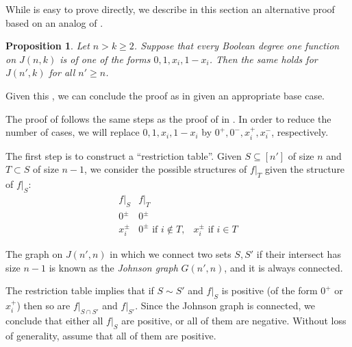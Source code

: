 \documentclass{article}
\newtheorem{proposition}[theorem]{Proposition}
\theoremstyle{definition}
\begin{document}
While  is easy to prove directly, we describe in this section an alternative proof based on an analog of .

\begin{proposition} \label{pro:step3-johnson}
Let $n > k \ge 2$. Suppose that every Boolean degree one function on $J(n,k)$ is of one of the forms $0, 1, x_i, 1-x_i$. Then the same holds for $J(n',k)$ for all $n' \ge n$.
\end{proposition}

Given this , we can conclude the proof as in  given an appropriate base case.

The proof of  follows the same steps as the proof of  in . In order to reduce the number of cases, we will replace $0,1,x_i,1-x_i$ by $0^+,0^-,x_i^+,x_i^-$, respectively.

The first step is to construct a ``restriction table''. Given $S \subseteq [n']$ of size $n$ and $T \subset S$ of size $n-1$, we consider the possible structures of $f|_T$ given the structure of $f|_S$:
\[
\begin{array}{c|ll}
f|_S & f|_T \\\hline
0^\pm & 0^\pm \\
x_i^\pm & 0^\pm \text{ if } i \notin T, & x_i^\pm \text{ if } i \in T
\end{array}
\]


The graph on $J(n',n)$ in which we connect two sets $S,S'$ if their intersect has size $n-1$ is known as the \emph{Johnson graph} $G(n',n)$, and it is always connected.

The restriction table implies that if $S \sim S'$ and $f|_S$ is positive (of the form $0^+$ or $x_i^+$) then so are $f|_{S \cap S'}$ and $f|_{S'}$. Since the Johnson graph is connected, we conclude that either all $f|_S$ are positive, or all of them are negative. Without loss of generality, assume that all of them are positive.
\end{document}
